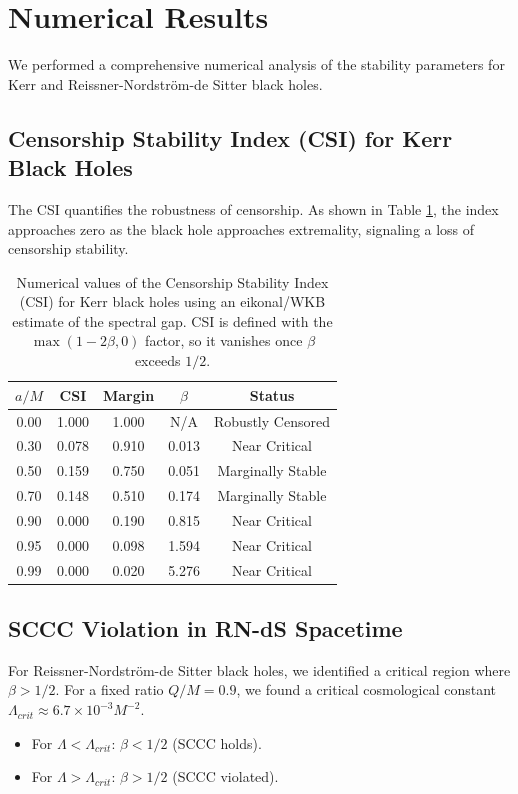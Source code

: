 \documentclass[12pt,a4paper]{article}
\begin{document}
\section{Numerical Results}
\label{sec:numerical-results}

We performed a comprehensive numerical analysis of the stability parameters for Kerr and Reissner-Nordström-de Sitter black holes.

\subsection{Censorship Stability Index (CSI) for Kerr Black Holes}

The CSI quantifies the robustness of censorship. As shown in Table \ref{tab:csi}, the index approaches zero as the black hole approaches extremality, signaling a loss of censorship stability.

\begin{table}[h!]
\centering
\begin{tabular}{|c|c|c|c|c|}
\hline
$a/M$ & CSI & Margin & $\beta$ & Status \\
\hline
0.00 & 1.000 & 1.000 & N/A & Robustly Censored \\
0.30 & 0.078 & 0.910 & 0.013 & Near Critical \\
0.50 & 0.159 & 0.750 & 0.051 & Marginally Stable \\
0.70 & 0.148 & 0.510 & 0.174 & Marginally Stable \\
0.90 & 0.000 & 0.190 & 0.815 & Near Critical \\
0.95 & 0.000 & 0.098 & 1.594 & Near Critical \\
0.99 & 0.000 & 0.020 & 5.276 & Near Critical \\
\hline
\end{tabular}
\caption{Numerical values of the Censorship Stability Index (CSI) for Kerr black holes using an eikonal/WKB estimate of the spectral gap. CSI is defined with the $\max(1-2\beta,0)$ factor, so it vanishes once $\beta$ exceeds $1/2$.}
\label{tab:csi}
\end{table}

\subsection{SCCC Violation in RN-dS Spacetime}

For Reissner-Nordström-de Sitter black holes, we identified a critical region where $\beta > 1/2$.
For a fixed ratio $Q/M = 0.9$, we found a critical cosmological constant $\Lambda_{crit} \approx 6.7 \times 10^{-3} M^{-2}$.
\begin{itemize}
    \item For $\Lambda < \Lambda_{crit}$: $\beta < 1/2$ (SCCC holds).
    \item For $\Lambda > \Lambda_{crit}$: $\beta > 1/2$ (SCCC violated).
\end{itemize}
\end{document}
